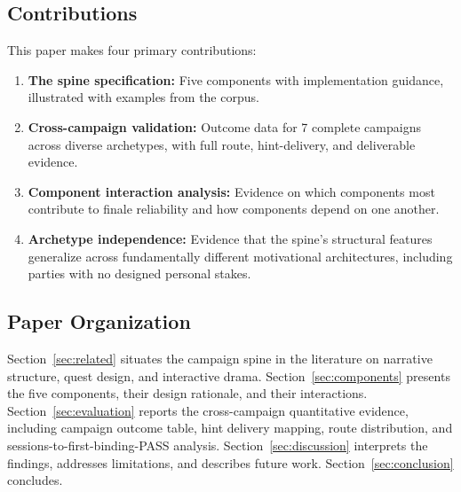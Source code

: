 \subsection{Contributions}

This paper makes four primary contributions:

\begin{enumerate}
  \item \textbf{The spine specification:} Five components with implementation
    guidance, illustrated with examples from the corpus.

  \item \textbf{Cross-campaign validation:} Outcome data for 7 complete
    campaigns across diverse archetypes, with full route, hint-delivery,
    and deliverable evidence.

  \item \textbf{Component interaction analysis:} Evidence on which components
    most contribute to finale reliability and how components depend on one another.

  \item \textbf{Archetype independence:} Evidence that the spine's structural
    features generalize across fundamentally different motivational architectures,
    including parties with no designed personal stakes.
\end{enumerate}

\subsection{Paper Organization}

Section~\ref{sec:related} situates the campaign spine in the literature on
narrative structure, quest design, and interactive drama. Section~\ref{sec:components}
presents the five components, their design rationale, and their interactions.
Section~\ref{sec:evaluation} reports the cross-campaign quantitative evidence,
including campaign outcome table, hint delivery mapping, route distribution,
and sessions-to-first-binding-PASS analysis. Section~\ref{sec:discussion}
interprets the findings, addresses limitations, and describes future work.
Section~\ref{sec:conclusion} concludes.
